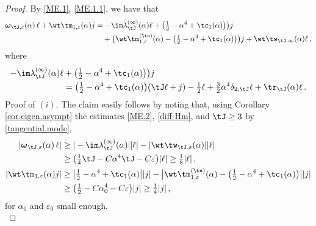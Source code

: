 \documentclass[a4paper,reqno,10pt]{article}
\newcommand{\bomega}{{\boldsymbol{\omega}}}
\begin{document}
\begin{proof}
    By \eqref{ME.1}, \eqref{ME.1.1}, we have that
    \begin{align}
        \bomega_{\tJ,\varepsilon}(\alpha)\,\ell + \wt\tm_{1,\varepsilon}(\alpha) j
        & = -\im \lambda_{\tJ}^{(\infty)}(\alpha) \ell + \big( \tfrac12 -\alpha^4 + \tc_{1}(\alpha) \big)  \big)j \\
         & \quad + \big( \wt\tm_{1,\varepsilon}^{(\tn)}(\alpha) - \big( \tfrac12 -\alpha^4 + \tc_{1}(\alpha) \big)  \big)j + \wt\tw_{\tJ,\infty}(\alpha) \ell  \,,\label{smalldiv.TR}
    \end{align}
    where
    \begin{align}
    	 -\im \lambda_{\tJ}^{(\infty)}(\alpha) \ell & + \big( \tfrac12 -\alpha^4 + \tc_{1}(\alpha) \big)  \big)j  \\
         & = \big( \tfrac12 - \alpha^4 +\tc_{1}(\alpha)  \big)(\tJ \ell +j) - \tfrac12\ell + \tfrac32 \alpha^4 \delta_{2,\tJ} \ell + \tr_{\tJ}(\alpha)\ell\,. \label{smalldiv.unpert.TR}
    \end{align}
      {\sc Proof of $(i)$}. The claim easily follows by noting that, using Corollary \ref{cor.eigen.asympt} the estimates \eqref{ME.2}, \eqref{diff-Hm}, and $\tJ\geq 3$ by \eqref{tangential.mode}, 
      \begin{align}
          | \bomega_{\tJ,\varepsilon}(\alpha)\,\ell | & \geq |-\im \lambda_{\tJ}^{(\infty)}(\alpha)||\ell| - |\wt\tw_{\tJ,\varepsilon}(\alpha)||\ell| \\
          &  \geq \big( \tfrac14 \tJ - C\alpha^4 \tJ - C\varepsilon\big) |\ell| \geq \tfrac18 |\ell| \,, \\
          |\wt\tm_{1,\varepsilon}(\alpha)j| &  \geq \big| \tfrac12 - \alpha^4 + \tc_{1}(\alpha) \big||j| -\big| \wt\tm_{1,\varepsilon}^{(\tn)}(\alpha) - \big( \tfrac12 -\alpha^4 + \tc_{1}(\alpha) \big)  \big| |j| \\
          & \geq \big( \tfrac12 - C\alpha_0^4 -C\varepsilon \big) |j| \geq \tfrac14 |j| \,,
      \end{align}
      for $\alpha_0$ and $\varepsilon_{0}$ small enough.
      \\[1mm]

\end{proof}
\end{document}
